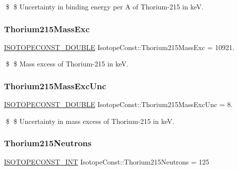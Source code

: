 \$ \$ Uncertainty in binding energy per A of Thorium-\/215 in keV. \mbox{\label{group___isotope_const-_thorium-_th215_gac387d9b9b027fda8d3cca14d65a8fd74}} 
\subsubsection{\texorpdfstring{Thorium215\+Mass\+Exc}{Thorium215MassExc}}
{\footnotesize\ttfamily \mbox{\hyperlink{group___isotope_const-_macros_ga8f45a7272ce02c0b4c65c44636ed719a}{I\+S\+O\+T\+O\+P\+E\+C\+O\+N\+S\+T\+\_\+\+D\+O\+U\+B\+LE}} Isotope\+Const\+::\+Thorium215\+Mass\+Exc = 10921.}

\$ \$ Mass excess of Thorium-\/215 in keV. \mbox{\label{group___isotope_const-_thorium-_th215_ga8055e65fd03f3fe803f0907ceef73c36}} 
\subsubsection{\texorpdfstring{Thorium215\+Mass\+Exc\+Unc}{Thorium215MassExcUnc}}
{\footnotesize\ttfamily \mbox{\hyperlink{group___isotope_const-_macros_ga8f45a7272ce02c0b4c65c44636ed719a}{I\+S\+O\+T\+O\+P\+E\+C\+O\+N\+S\+T\+\_\+\+D\+O\+U\+B\+LE}} Isotope\+Const\+::\+Thorium215\+Mass\+Exc\+Unc = 8.}

\$ \$ Uncertainty in mass excess of Thorium-\/215 in keV. \mbox{\label{group___isotope_const-_thorium-_th215_gaf06f4a55a2c793584eca894132af8a61}} 
\subsubsection{\texorpdfstring{Thorium215\+Neutrons}{Thorium215Neutrons}}
{\footnotesize\ttfamily \mbox{\hyperlink{group___isotope_const-_macros_ga5f18360b3e99483a35c32d789e62621c}{I\+S\+O\+T\+O\+P\+E\+C\+O\+N\+S\+T\+\_\+\+I\+NT}} Isotope\+Const\+::\+Thorium215\+Neutrons = 125}


